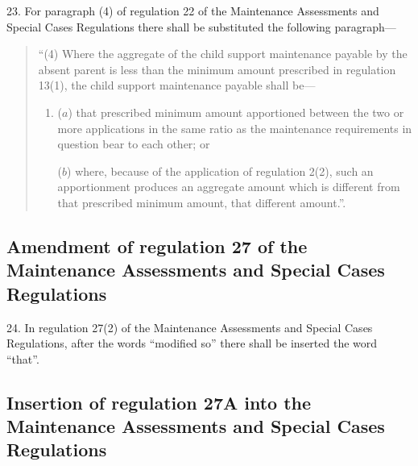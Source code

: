 \documentclass[a4paper]{article}
\begin{document}
23.  For paragraph (4) of regulation 22 of the Maintenance Assessments and Special Cases Regulations there shall be substituted the following paragraph---
\begin{quotation}
\begin{sloppypar}
“(4) Where the aggregate of the child support maintenance payable by the absent parent is less than the minimum amount prescribed in regulation 13(1), the child support maintenance payable shall be---
\end{sloppypar}
\begin{enumerate}\item[]
($a$) that prescribed minimum amount apportioned between the two or more applications in the same ratio as the maintenance requirements in question bear to each other; or

($b$) where, because of the application of regulation 2(2), such an apportionment produces an aggregate amount which is different from that prescribed minimum amount, that different amount.”.
\end{enumerate}
\end{quotation}

\subsection[24. Amendment of regulation 27 of the Maintenance Assessments and Special Cases Regulations]{Amendment of regulation 27 of the Maintenance Assessments and Special Cases Regulations}

24.  In regulation 27(2) of the Maintenance Assessments and Special Cases Regulations, after the words “modified so” there shall be inserted the word “that”.

\subsection[25. Insertion of regulation 27A into the Maintenance Assessments and Special Cases Regulations]{Insertion of regulation 27A into the Maintenance Assessments and Special Cases Regulations}
\end{document}
